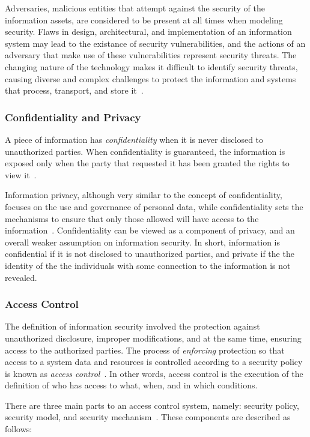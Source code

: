 \documentclass[12pt]{article}
\begin{document}
Adversaries, malicious entities that attempt against the security of the information assets, are considered to be present at all times when modeling security. Flaws in design, architectural, and implementation of an information system may lead to the existance of security vulnerabilities, and the actions of an adversary that make use of these vulnerabilities represent security threats. The changing nature of the technology makes it difficult to identify security threats, causing diverse and complex challenges to protect the information and systems that process, transport, and store it~\cite{whitman2003}.

\subsubsection{Confidentiality and Privacy}

A piece of information has \emph{confidentiality} when it is never disclosed to unauthorized parties. When confidentiality is guaranteed, the information is exposed only when the party that requested it has been granted the rights to view it~\cite{whitman2011principles}.

Information privacy, although very similar to the concept of confidentiality, focuses on the use and governance of personal data, while confidentiality sets the mechanisms to ensure that only those allowed will have access to the information~\cite{heckman}. Confidentiality can be viewed as a component of privacy, and an overall weaker assumption on information security. In short, information is confidential if it is not disclosed to unauthorized parties, and private if the the identity of the the individuals with some connection to the information is not revealed.

\subsubsection{Access Control}

The definition of information security involved the protection against unauthorized disclosure, improper modifications, and at the same time, ensuring access to the authorized parties. The process of \emph{enforcing} protection so that access to a system data and resources is controlled according to a security policy is known as \emph{access control}~\cite{access_02}. In other words, access control is the execution of the definition of who has access to what, when, and in which conditions.

There are three main parts to an access control system, namely: security policy, security model, and security mechanism~\cite{access_02}. These components are described as follows:
\end{document}
